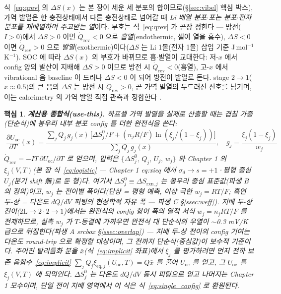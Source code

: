 \documentclass[11pt,a4paper]{article}
\newtheorem*{keybox}{핵심}
\newcommand{\rxn}{\mathrm{rxn}}
\newcommand{\eq}{\mathrm{eq}}
\newcommand{\rev}{\mathrm{rev}}
\newcommand{\oc}{\mathrm{oc}}
\begin{document}
식~\eqref{eq:qrev} 의 $\Delta S(x)$ 는 본 장이 세운 세 분포의 합이므로(\S\ref{sec:vibel} 핵심 박스), 가역
발열은 한 충전상태에서 다른 충전상태로 넘어갈 때 \emph{Li 배열 분포$\cdot$포논 분포$\cdot$전자 분포를 재배열하며
주고받는 열}이다. 부호는 식~\eqref{eq:qrev} 가 곧장 정한다 — 방전($I>0$)에서 $\Delta S>0$ 이면 $\dot Q_\rev<0$ 으로
\emph{흡열}(endothermic, 셀이 열을 흡수), $\Delta S<0$ 이면 $\dot Q_\rev>0$ 으로 \emph{발열}(exothermic)이다($\Delta S$
는 Li 1몰(전자 1몰) 삽입 기준 J\,mol$^{-1}$K$^{-1}$). SOC 에 따라 $\Delta S(x)$ 의 부호가 바뀌므로 흡$\cdot$발열이 교대한다: 저-$x$ 에서
config 양의 발산이 지배해 $\Delta S>0$ 이므로 방전 시 $\dot Q_\rev<0$(흡열), 고-$x$ 에서 vibrational 음
baseline 이 드러나 $\Delta S<0$ 이 되어 방전이 발열로 돈다. stage $2\to1$($x\approx0.5$)의 큰 음의 $\Delta S$
는 방전 시 $\dot Q_\rev>0$, 곧 가역 발열의 두드러진 신호를 남기며, 이는 calorimetry 의 가역 발열 직접 관측과
정합한다 \cite{standardised2024}.

\begin{keybox}
\textbf{계산용 종합식(use-this).} 하프셀 가역 발열을 실제로 산출할 때는 겹침 가중(단순식)에 봉우리 내부 분포
config 를 더한 \emph{완전식}을 쓴다:
\[
\boxed{\;\frac{\partial U_\oc}{\partial T}(x)
=\frac{\sum_j Q_j\,g_j(x)\,\bigl[\Delta S^0_j/F+(n_jR/F)\ln(\xi_j/(1-\xi_j))\bigr]}{\sum_j Q_j\,g_j(x)},\quad
g_j=\frac{\xi_j(1-\xi_j)}{w_j}\;}
\]
$\dot Q_\rev=-IT\,\partial U_\oc/\partial T$ 로 얻으며, \emph{입력}은 $\{\Delta S^0_j,\,Q_j,\,U_j,\,w_j\}$ 와 Chapter 1 의
$\xi_j(V,T)$(본 장 식~\eqref{eq:logistic} — Chapter 1 eq:xieq 에서 $\sigma_d\to s{=}+1$·평형 중심 $U_j$(분기 shift 無)로 둔 형)다. 여기서 $\Delta S^0_j\equiv\Delta S_{\rxn,j}$ 는 봉우리 중심 표준값(파생 B 의
정의)이고, $w_j$ 는 전이별 폭이다(단상 = 평형 예측, 이상 극한 $w_j{=}RT/F$; 흑연 두-상 = 다온도 $dQ/dV$
피팅의 현상학적 자유 폭 — 파생 C \S\ref{ssec:weff}). 지배 두-상 전이($2\mathrm L\!\to\!2\cdot2\!\to\!1$)에서는 완전식의
config 항이 폭의 열적 서식 $w_j=n_jRT/F$ 를 전제하므로, 실측 $w_j$ 가 $T$-동결에 가까우면 완전식 대 단순식의
우열이 $\sim$0.3 mV/K 급으로 뒤집힌다(파생 A srcbox \S\ref{ssec:overlap}) — 지배 두-상 전이의 config 기여는
다온도 round-trip 으로 확정할 대상이며, 그 전까지 단순식(중심값)이 보수적 기준이다. 주어진 탈리튬화 분율 $\bar x$(식~\eqref{eq:implicit} 좌표)에서 $\xi_j$ 를 평가하려면 먼저 전하 보존
음함수~\eqref{eq:implicit} $\sum_j Q_j\xi_{\eq,j}(U_\oc,T)=Q\bar x$ 를 풀어 $U_\oc$ 를 얻고, 그 $U_\oc$ 를
$\xi_j(V,T)$ 에 되먹인다. $\Delta S^0_j$ 는 다온도 $dQ/dV$ 동시 피팅으로 얻고 나머지는 Chapter 1 모수이며, 단일 전이 지배 영역에서 이 식은
식~\eqref{eq:single_config} 로 환원된다.
\end{keybox}
\end{document}
